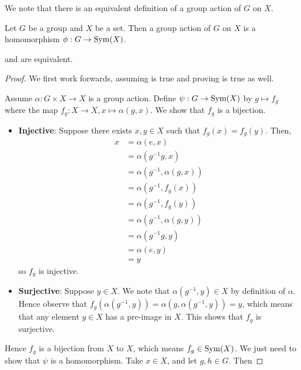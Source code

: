We note that there is an equivalent definition of a group action of $G$ on $X$.
\begin{definition}\label{definition-group-action-alt}
    Let $G$ be a group and $X$ be a set. Then a group action of $G$ on $X$ is a homomorphism $\phi: G\to \mathrm{Sym}(X)$.
\end{definition}
\begin{theorem}\label{thrm-group-action-definition-equivalence}
     and  are equivalent.
\end{theorem}
\begin{proof}
    We first work forwards, assuming  is true and proving  is true as well.
    
    Assume $\alpha: G \times X \to X$ is a group action. Define $\psi: G \to \mathrm{Sym}(X)$ by $g \mapsto f_g$ where the map $f_g: X \to X, x \mapsto \alpha(g, x)$. We show that $f_g$ is a bijection.
    \begin{itemize}
        \item \textbf{Injective}: Suppose there exists $x, y \in X$ such that $f_g(x) = f_g(y)$. Then,
        \begin{align*}
            x &= \alpha(e, x)\\
            &= \alpha(g^{-1}g, x)\\
            &= \alpha(g^{-1}, \alpha(g, x))\\
            &= \alpha(g^{-1}, f_g(x))\\
            &= \alpha(g^{-1}, f_g(y))\\
            &= \alpha(g^{-1}, \alpha(g, y))\\
            &= \alpha(g^{-1}g, y)\\
            &= \alpha(e, y)\\
            &= y
        \end{align*}
        so $f_g$ is injective.
        \item \textbf{Surjective}: Suppose $y \in X$. We note that $\alpha(g^{-1}, y) \in X$ by definition of $\alpha$. Hence observe that $f_g(\alpha(g^{-1}, y)) = \alpha(g, \alpha(g^{-1}, y)) = y$, which means that any element $y \in X$ has a pre-image in $X$. This shows that $f_g$ is surjective.
    \end{itemize}
    Hence $f_g$ is a bijection from $X$ to $X$, which means $f_g \in \mathrm{Sym}(X)$. We just need to show that $\psi$ is a homomorphism. Take $x \in X$, and let $g, h \in G$. Then

\end{proof}
